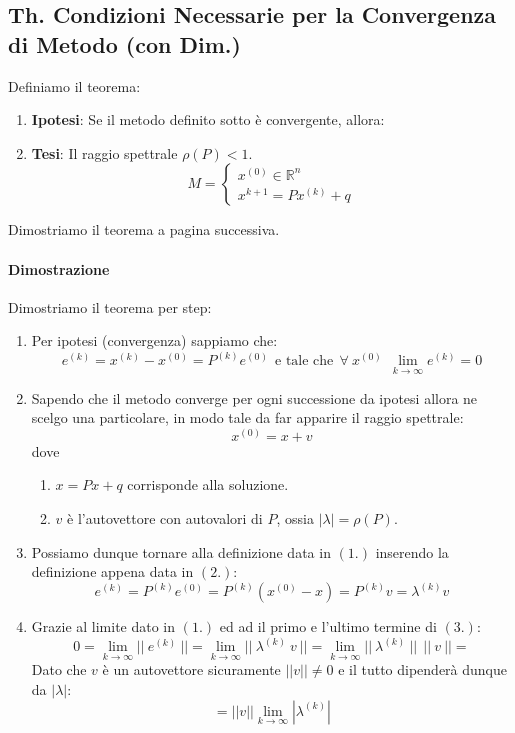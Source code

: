 \documentclass{article}
\begin{document}
\subsection{Th. Condizioni Necessarie per la Convergenza di Metodo (con Dim.)}

Definiamo il teorema:

\begin{enumerate}
    \item \textbf{Ipotesi}: Se il metodo definito sotto è convergente, allora:
    \item \textbf{Tesi}: Il raggio spettrale $\rho(P) < 1$.
    \vspace*{10px}
    \[ M = \left\{ \begin{array}{lll}
        x^{(0)} \in \mathbb{R}^{n} \\ 
        x^{k+1} = Px^{(k)} + q 
        \end{array}\right.
         \]
\end{enumerate}

Dimostriamo il teorema a pagina successiva.

\newpage

\paragraph{Dimostrazione} Dimostriamo il teorema per step:

\begin{enumerate}
    \item Per ipotesi (convergenza) sappiamo che:
    \[ e^{(k)} = x^{(k)} - x^{(0)} = P^{(k)}e^{(0)} \:\: \text{e tale che} \:\: \forall \: x^{(0)} \: \: \lim_{k \rightarrow \infty} e^{(k)} = 0\]
    \item Sapendo che il metodo converge per ogni successione da ipotesi allora ne scelgo una particolare, in modo tale da far apparire il raggio spettrale:
    \[ x^{(0)} = x + v \]
    dove
    \begin{enumerate}
        \item $x = Px + q$ corrisponde alla soluzione.
        \item $v$ è l'autovettore con autovalori di $P$, ossia $|\lambda| = \rho(P)$.
    \end{enumerate}
    \item Possiamo dunque tornare alla definizione data in $(1.)$ inserendo la definizione appena data in $(2.)$:
    \[ e^{(k)} = P^{(k)}e^{(0)} = P^{(k)}(x^{(0)} - x) = P^{(k)}v = \lambda^{(k)}v \]
    \item Grazie al limite dato in $(1.)$ ed ad il primo e l'ultimo termine di $(3.)$:
    \[ 0 = \lim_{k \rightarrow \infty} ||\:e^{(k)}\:|| = \lim_{k \rightarrow \infty} ||\:\lambda^{(k)} \: v \:|| = \lim_{k \rightarrow \infty} ||\:\lambda^{(k)} \:||\:\:||\: v \:|| = \]
    Dato che $v$ è un autovettore sicuramente $||v|| \neq 0$ e il tutto dipenderà dunque da $|\lambda|$:
    \[ = ||v|| \lim_{k \rightarrow \infty} |\lambda^{(k)}| \]
\end{enumerate}
\end{document}
